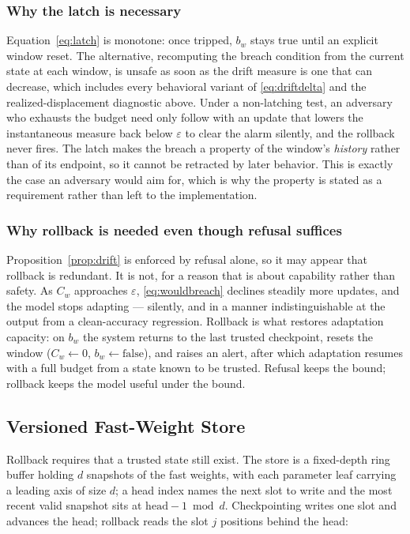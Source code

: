 \documentclass[journal]{IEEEtran}
\newcommand{\budget}{\varepsilon}
\begin{document}
\subsubsection{Why the latch is necessary}
Equation~\eqref{eq:latch} is monotone: once tripped, $b_w$ stays true until an
explicit window reset. The alternative, recomputing the breach condition from the
current state at each window, is unsafe as soon as the drift measure is one that
can decrease, which includes every behavioral variant of \eqref{eq:driftdelta} and
the realized-displacement diagnostic above. Under a non-latching test, an adversary
who exhausts the budget need only follow with an update that lowers the instantaneous
measure back below $\budget$ to clear the alarm silently, and the rollback never
fires. The latch makes the breach a property of the window's \emph{history} rather
than of its endpoint, so it cannot be retracted by later behavior. This is exactly
the case an adversary would aim for, which is why the property is stated as a
requirement rather than left to the implementation.

\subsubsection{Why rollback is needed even though refusal suffices}
Proposition~\ref{prop:drift} is enforced by refusal alone, so it may appear that
rollback is redundant. It is not, for a reason that is about capability rather than
safety. As $C_w$ approaches $\budget$, \eqref{eq:wouldbreach} declines steadily more
updates, and the model stops adapting --- silently, and in a manner indistinguishable
at the output from a clean-accuracy regression. Rollback is what restores adaptation
capacity: on $b_w$ the system returns to the last trusted checkpoint, resets the
window ($C_w \gets 0$, $b_w \gets \text{false}$), and raises an alert, after which
adaptation resumes with a full budget from a state known to be trusted. Refusal keeps
the bound; rollback keeps the model useful under the bound.

\subsection{Versioned Fast-Weight Store}
\label{sec:store}

Rollback requires that a trusted state still exist. The store is a fixed-depth ring
buffer holding $d$ snapshots of the fast weights, with each parameter leaf carrying a
leading axis of size $d$; a head index names the next slot to write and the most
recent valid snapshot sits at $\mathrm{head}-1 \bmod d$. Checkpointing writes one
slot and advances the head; rollback reads the slot $j$ positions behind the head:
\end{document}
